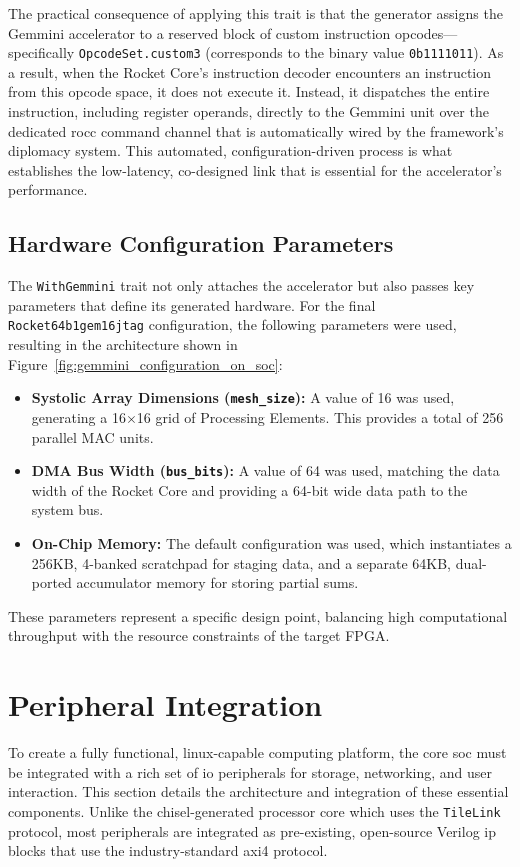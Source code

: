 The practical consequence of applying this trait is that the generator assigns the Gemmini accelerator to a reserved block of custom instruction opcodes—specifically \texttt{OpcodeSet.custom3} (corresponds to the binary value \texttt{0b1111011}). As a result, when the Rocket Core's instruction decoder encounters an instruction from this opcode space, it does not execute it. Instead, it dispatches the entire instruction, including register operands, directly to the Gemmini unit over the dedicated \acrshort{rocc} command channel that is automatically wired by the framework's diplomacy system. This automated, configuration-driven process is what establishes the low-latency, co-designed link that is essential for the accelerator's performance.

\subsection{Hardware Configuration Parameters}

The \texttt{WithGemmini} trait not only attaches the accelerator but also passes key parameters that define its generated hardware. For the final \texttt{Rocket64b1gem16jtag} configuration, the following parameters were used, resulting in the architecture shown in Figure~\ref{fig:gemmini_configuration_on_soc}:
\begin{itemize}
    \item \textbf{Systolic Array Dimensions (\texttt{mesh\_size}):} A value of 16 was used, generating a 16$\times$16 grid of Processing Elements. This provides a total of 256 parallel MAC units.
    \item \textbf{DMA Bus Width (\texttt{bus\_bits}):} A value of 64 was used, matching the data width of the Rocket Core and providing a 64-bit wide data path to the system bus.
    \item \textbf{On-Chip Memory:} The default configuration was used, which instantiates a 256KB, 4-banked scratchpad for staging data, and a separate 64KB, dual-ported accumulator memory for storing partial sums.
\end{itemize}
These parameters represent a specific design point, balancing high computational throughput with the resource constraints of the target FPGA.

\section{Peripheral Integration}

To create a fully functional, \acrshort{linux}-capable computing platform, the core \acrshort{soc} must be integrated with a rich set of \acrshort{io} peripherals for storage, networking, and user interaction. This section details the architecture and integration of these essential components. Unlike the \acrshort{chisel}-generated processor core which uses the \texttt{TileLink} protocol, most peripherals are integrated as pre-existing, open-source Verilog \acrshort{ip} blocks that use the industry-standard \acrshort{axi4} protocol.

